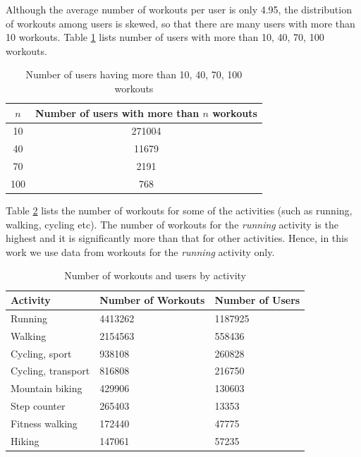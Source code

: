 \documentclass{acm_proc_article-sp}
\begin{document}
Although the average number of workouts per user is only 4.95, the distribution of workouts among users is skewed, so that there are many users with more than 10 workouts. Table \ref{tableStatsUsers} lists number of users with more than 10, 40, 70, 100 workouts.

\begin{table}[h]
\centering
\begin{tabular}{|c|c|} \hline
\bf{$n$} & \bf{Number of users with more than $n$ workouts}  \\ \hline
10  &  271004        \\ \hline
40  &  11679   \\ \hline
70  &  2191  \\ \hline
100 &  768 \\ \hline
\end{tabular}
\caption{Number of users having more than 10, 40, 70, 100 workouts}
\label{tableStatsUsers}
\end{table}

Table \ref{tableStatsByActivity} lists the number of workouts for some of the activities (such as running, walking, cycling etc). The number of workouts for the \emph{running} activity is the highest and it is significantly more than that for other activities. Hence, in this work we use data from workouts for the \emph{running} activity only.

\begin{table}[h]
\centering
\begin{tabular}{|p{3cm}|p{2cm}|p{2cm}|} \hline
\bf{Activity} & \bf{Number of Workouts} & \bf{Number of Users} \\ \hline
Running  &           4413262 & 1187925 \\ \hline
Walking  &           2154563 & 558436 \\ \hline
Cycling, sport  &     938108 & 260828 \\ \hline
Cycling, transport & 816808 &  216750 \\ \hline
Mountain biking  &   429906 & 130603 \\ \hline
Step counter     &   265403 & 13353 \\ \hline
Fitness walking   &  172440 & 47775 \\ \hline
Hiking &   147061 & 57235 \\ \hline
\end{tabular}
\caption{Number of workouts and users by activity}
\label{tableStatsByActivity}
\end{table}
\end{document}
